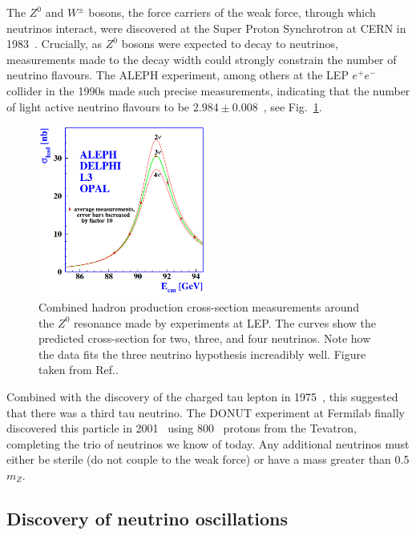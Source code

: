The $Z^{0}$ and $W^{\pm}$ bosons, the force carriers of the weak force, through which neutrinos
interact, were discovered at the Super Proton Synchrotron at CERN in
1983~\cite{arnison1983_z,arnison1983_w}. Crucially, as $Z^{0}$ bosons were expected to decay to
neutrinos, measurements made to the decay width could strongly constrain the number of neutrino
flavours. The ALEPH experiment, among others at the LEP $e^{+}e^{-}$ collider in the 1990s made
such precise measurements, indicating that the number of light active neutrino flavours to be
$2.984\pm0.008$~\cite{electroweak2006}, see Fig.~\ref{fig:z_resonance}.

\begin{figure} %
    \includegraphics[origin=c,width=0.5\textwidth]{diagrams/3-theory/z_resonance.png}
    \caption[z resonance short]
    {Combined hadron production cross-section measurements around the $Z^{0}$ resonance made by
        experiments at LEP. The curves show the predicted cross-section for two, three, and four
        neutrinos. Note how the data fits the three neutrino hypothesis increadibly well.
        Figure taken from Ref.\cite{electroweak2006}.}
    \label{fig:z_resonance}
\end{figure} %

Combined with the discovery of the charged tau lepton in 1975~\cite{perl1975}, this suggested that
there was a third tau neutrino. The DONUT experiment at Fermilab finally discovered this particle
in 2001~\cite{Kodama2001} using 800 \GeV ~protons from the Tevatron, completing the trio of
neutrinos we know of today. Any additional neutrinos must either be sterile (do not couple to the
weak force) or have a mass greater than 0.5 $m_{Z}$.

\subsection{Discovery of neutrino oscillations} %
\label{sec:theory_history_neutrinos}

